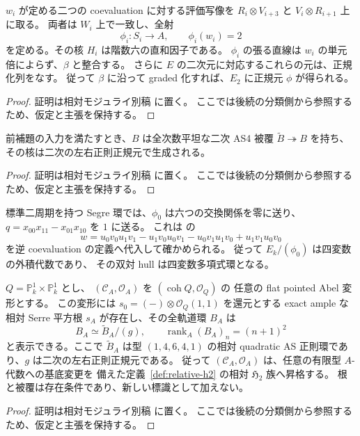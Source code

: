 \begin{lemma}
\label{lem:relative-canonical-hull-functional}
$w_i$ が定める二つの coevaluation に対する評価写像を
$R_i\otimes V_{i+3}$ と $V_i\otimes R_{i+1}$ 上に取る。
両者は $W_i$ 上で一致し、全射
\[
 \phi_i:S_i\longrightarrow A,\qquad \phi_i(w_i)=2
\]
を定める。その核 $H_i$ は階数六の直和因子である。
$\phi_i$ の張る直線は $w_i$ の単元倍によらず、$\beta$ と整合する。
さらに $E$ の二次元に対応するこれらの元は、正規化列をなす。
従って $\beta$ に沿って graded 化すれば、$E_2$ に正規元
$\phi$ が得られる。
\end{lemma}
\begin{proof}
証明は相対モジュライ別稿 \cite[\texttt{quadric_artin_hull} 節]{QuadricModuli2026} に置く。
ここでは後続の分類側から参照するため、仮定と主張を保持する。
\end{proof}

\begin{proposition}
\label{prop:relative-artin-hull-from-functional}
前補題の入力を満たすとき、$B$ は全次数平坦な二次 AS4 被覆
$\widetilde B\twoheadrightarrow B$ を持ち、その核は二次の左右正則正規元で生成される。
\end{proposition}
\begin{proof}
証明は相対モジュライ別稿 \cite[\texttt{quadric_artin_hull} 節]{QuadricModuli2026} に置く。
ここでは後続の分類側から参照するため、仮定と主張を保持する。
\end{proof}

\begin{remark}[可換ファイバーでの正規化]
標準二周期を持つ Segre 環では、$\phi_0$ は六つの交換関係を零に送り、
$q=x_{00}x_{11}-x_{01}x_{10}$ を $1$ に送る。
これは \cite[(5.3)]{VdB2011} の
\[
 w=u_0v_0u_1v_1-u_1v_0u_0v_1-u_0v_1u_1v_0+u_1v_1u_0v_0
\]
を逆 coevaluation の定義へ代入して確かめられる。
従って $E_k/(\phi_0)$ は四変数の外積代数であり、
その双対 hull は四変数多項式環となる。
\end{remark}

\begin{theorem}
\label{thm:quadric-all-artin-h2}
$Q=\mathbb P^1_k\times\mathbb P^1_k$ とし、
$(\mathcal C_A,\mathcal O_A)$ を $(\operatorname{coh}Q,\mathcal O_Q)$ の
任意の flat pointed Abel 変形とする。
この変形には $s_0=(-)\otimes\mathcal O_Q(1,1)$ を還元とする
exact ample な相対 Serre 平方根 $s_A$ が存在し、その全軌道環 $B_A$ は
\[
 B_A\simeq\widetilde B_A/(g),\qquad
 \operatorname{rank}_A(B_A)_n=(n+1)^2
\]
と表示できる。ここで $\widetilde B_A$ は型 $(1,4,6,4,1)$ の相対 quadratic
AS 正則環であり、$g$ は二次の左右正則正規元である。
従って $(\mathcal C_A,\mathcal O_A)$ は、任意の有限型 $A$-代数への基底変更を
備えた定義~\ref{def:relative-h2} の相対 $\mathfrak H_2$ 族へ昇格する。
根と被覆は存在条件であり、新しい標識として加えない。
\end{theorem}
\begin{proof}
証明は相対モジュライ別稿 \cite[\texttt{quadric_artin_hull} 節]{QuadricModuli2026} に置く。
ここでは後続の分類側から参照するため、仮定と主張を保持する。
\end{proof}

